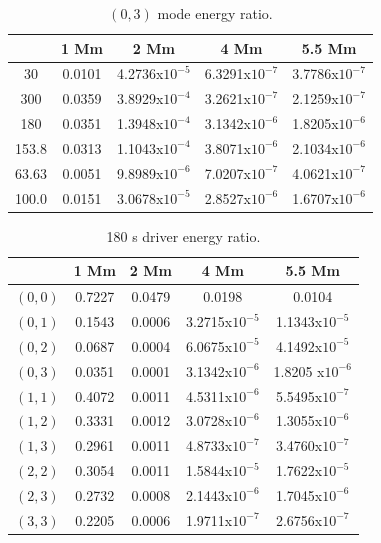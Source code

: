 \documentclass[preprint,authoryear,12pt]{elsarticle}
\begin{document}
\begin{table}[h]
\centering
\begin{tabular}{c c c c c }
\hline
   &  1 Mm & 2 Mm & 4 Mm & 5.5 Mm \\
\hline
30 &  0.0101 &  4.2736x$10^{-5}$ & 6.3291x$10^{-7}$ & 3.7786x$10^{-7}$\\
\hline
300 & 0.0359 & 3.8929x$10^{-4}$ & 3.2621x$10^{-7}$ & 2.1259x$10^{-7}$\\
\hline
180 & 0.0351 &1.3948x$10^{-4}$ & 3.1342x$10^{-6}$ & 1.8205x$10^{-6}$\\
\hline
153.8 & 0.0313 & 1.1043x$10^{-4}$ & 3.8071x$10^{-6}$ & 2.1034x$10^{-6}$\\
\hline
63.63 & 0.0051 & 9.8989x$10^{-6}$ & 7.0207x$10^{-7}$ & 4.0621x$10^{-7}$\\
\hline
100.0 & 0.0151 & 3.0678x$10^{-5}$ & 2.8527x$10^{-6}$ & 1.6707x$10^{-6}$\\
\hline
\end{tabular} 
\caption{$(0, 3)$ mode energy ratio.}
\label{Table03mode}
\end{table}

\begin{table}[h]
\centering
\begin{tabular}{c c c c c }
\hline
   &  1 Mm & 2 Mm & 4 Mm & 5.5 Mm \\
\hline
$(0, 0)$ &  0.7227 & 0.0479 & 0.0198 & 0.0104 \\
\hline
$(0, 1)$ & 0.1543 & 0.0006 & 3.2715x$10^{-5}$ &  1.1343x$10^{-5}$\\
\hline
$(0, 2)$ & 0.0687 & 0.0004 & 6.0675x$10^{-5}$ &  4.1492x$10^{-5}$\\
\hline
$(0, 3)$ & 0.0351 & 0.0001 & 3.1342x$10^{-6}$ & 1.8205 x$10^{-6}$\\
\hline
$(1, 1)$ & 0.4072 & 0.0011 & 4.5311x$10^{-6}$ &  5.5495x$10^{-7}$\\
\hline
$(1, 2)$ & 0.3331 & 0.0012 & 3.0728x$10^{-6}$ &  1.3055x$10^{-6}$\\
\hline
$(1, 3)$ & 0.2961 & 0.0011 & 4.8733x$10^{-7}$ &  3.4760x$10^{-7}$\\
\hline
$(2, 2)$ & 0.3054 & 0.0011 & 1.5844x$10^{-5}$ &  1.7622x$10^{-5}$\\
\hline
$(2, 3)$ & 0.2732 & 0.0008 & 2.1443x$10^{-6}$ &  1.7045x$10^{-6}$\\
\hline
$(3, 3)$ & 0.2205 & 0.0006 & 1.9711x$10^{-7}$ &  2.6756x$10^{-7}$\\
\hline
\end{tabular} 
\caption{180 s driver energy ratio.}
\label{Table180}
\end{table}
\end{document}
